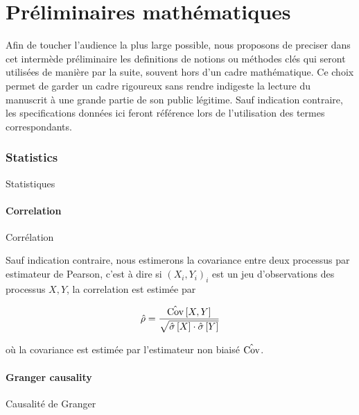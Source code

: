 \stars







\chapter*{Préliminaires mathématiques}





Afin de toucher l'audience la plus large possible, nous proposons de preciser dans cet intermède préliminaire les definitions de notions ou méthodes clés qui seront utilisées de manière par la suite, souvent hors d'un cadre mathématique. Ce choix permet de garder un cadre rigoureux sans rendre indigeste la lecture du manuscrit à une grande partie de son public légitime. Sauf indication contraire, les specifications données ici feront référence lors de l'utilisation des termes correspondants.



\subsection*{Statistics}{Statistiques}


\subsubsection*{Correlation}{Corrélation}

Sauf indication contraire, nous estimerons la covariance entre deux processus par estimateur de Pearson, c'est à dire si $(X_i,Y_i)_i$ est un jeu d'observations des processus $X,Y$, la correlation est estimée par

\[
\hat{\rho} = \frac{\hat{\operatorname{Cov}}\left[X,Y\right]}{\sqrt{\hat{\sigma} \left[X\right] \cdot \hat{\sigma}\left[Y\right]}}
\]

où la covariance est estimée par l'estimateur non biaisé $\hat{\operatorname{Cov}}$.




\subsubsection*{Granger causality}{Causalité de Granger}


